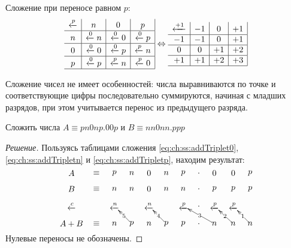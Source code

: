 Сложение при переносе равном $p$:
\begin{equation}
    \label{eq:ch:ss:addTripletp}
    \begin{array}[c]{c|c|c|c|}
        \xleftarrow{p}  & n & 0 & p \\
        \hline
        n & \xleftarrow{0}n & \xleftarrow{0}0 & \xleftarrow{0}p \\
        \hline
        0 & \xleftarrow{0}0 & \xleftarrow{0}p & \xleftarrow{p}n \\
        \hline
        p & \xleftarrow{0}p & \xleftarrow{p}n & \xleftarrow{p}0 \\
        \hline
    \end{array}
    \Leftrightarrow
    \begin{array}[c]{c|c|c|c|}
        \xleftarrow{+1} & -1 &  0 & +1 \\
        \hline
        -1 & -1 &  0 & +1 \\
        \hline
        0  & 0  & +1 & +2 \\
        \hline
        +1 & +1 & +2 & +3 \\
        \hline
    \end{array}
\end{equation}

Сложение чисел не имеет особенностей: числа выравниваются по точке и соответствующие цифры последовательно суммируются, начиная с младших разрядов, при этом учитывается перенос из предыдущего разряда.

\begin{exampl}[Задача]
    Сложить числа $A\equiv pn0np.00p$ и $B\equiv nn0nn.ppp$
\end{exampl}
\begin{proof}[Решение]
    Пользуясь таблицами сложения  \eqref{eq:ch:ss:addTriplet0}, \eqref{eq:ch:ss:addTripletn} и \eqref{eq:ch:ss:addTripletp}, находим результат:
    \[
        {\entrymodifiers={}
            {\xymatrix@=1pc{
                A&\equiv
                    &p&n&0&n&p&.&0&0&p\\
                B&\equiv
                    &n&n&0&n&n&.&p&p&p\\
                \xleftarrow{c}
                 &  &\xleftarrow{n}
                        & 
                            &\xleftarrow{n}
                                & 
                                    &\xleftarrow{p}
                                        &.
                                            &\xleftarrow{p}
                                                &\xleftarrow{p}
                                                    &\\
                A+B&\equiv
                    &n
                      &p\ar[ul]|-{5}
                        &n
                          &p\ar[ul]|-{4}
                            &p
                              &.
                                &n\ar[ull]|-{3}
                                  &n\ar[ul]|-{2}
                                    &n\ar[ul]|-{1}
            }}
        }
    \]
    Нулевые переносы не обозначены.
\end{proof}

